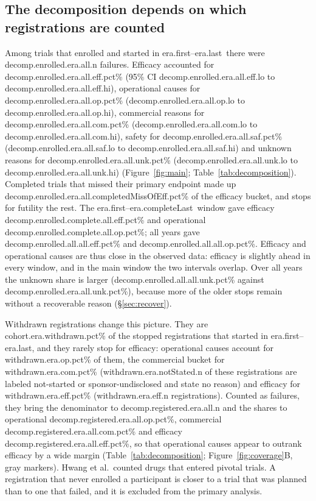 \documentclass[11pt]{article}
\newcommand{\era}{\num{era.first}--\num{era.last}}
\newcommand{\eracomplete}{\num{era.first}--\num{era.completeLast}}
\begin{document}
\subsection{The decomposition depends on which registrations are counted}\label{sec:population}
Among trials that enrolled and started in \era\ there were \num{decomp.enrolled.era.all.n} failures. Efficacy accounted for \num{decomp.enrolled.era.all.eff.pct}\% (95\% CI \num{decomp.enrolled.era.all.eff.lo} to \num{decomp.enrolled.era.all.eff.hi}), operational causes for \num{decomp.enrolled.era.all.op.pct}\% (\num{decomp.enrolled.era.all.op.lo} to \num{decomp.enrolled.era.all.op.hi}), commercial reasons for \num{decomp.enrolled.era.all.com.pct}\% (\num{decomp.enrolled.era.all.com.lo} to \num{decomp.enrolled.era.all.com.hi}), safety for \num{decomp.enrolled.era.all.saf.pct}\% (\num{decomp.enrolled.era.all.saf.lo} to \num{decomp.enrolled.era.all.saf.hi}) and unknown reasons for \num{decomp.enrolled.era.all.unk.pct}\% (\num{decomp.enrolled.era.all.unk.lo} to \num{decomp.enrolled.era.all.unk.hi}) (Figure~\ref{fig:main}; Table~\ref{tab:decomposition}). Completed trials that missed their primary endpoint made up \num{decomp.enrolled.era.all.completedMissOfEff.pct}\% of the efficacy bucket, and stops for futility the rest. The \eracomplete\ window gave efficacy \num{decomp.enrolled.complete.all.eff.pct}\% and operational \num{decomp.enrolled.complete.all.op.pct}\%; all years gave \num{decomp.enrolled.all.all.eff.pct}\% and \num{decomp.enrolled.all.all.op.pct}\%. Efficacy and operational causes are thus close in the observed data: efficacy is slightly ahead in every window, and in the main window the two intervals overlap. Over all years the unknown share is larger (\num{decomp.enrolled.all.all.unk.pct}\% against \num{decomp.enrolled.era.all.unk.pct}\%), because more of the older stops remain without a recoverable reason (\S\ref{sec:recover}).

Withdrawn registrations change this picture. They are \num{cohort.era.withdrawn.pct}\% of the stopped registrations that started in \era, and they rarely stop for efficacy: operational causes account for \num{withdrawn.era.op.pct}\% of them, the commercial bucket for \num{withdrawn.era.com.pct}\% (\num{withdrawn.era.notStated.n} of these registrations are labeled not-started or sponsor-undisclosed and state no reason) and efficacy for \num{withdrawn.era.eff.pct}\% (\num{withdrawn.era.eff.n} registrations). Counted as failures, they bring the denominator to \num{decomp.registered.era.all.n} and the shares to operational \num{decomp.registered.era.all.op.pct}\%, commercial \num{decomp.registered.era.all.com.pct}\% and efficacy \num{decomp.registered.era.all.eff.pct}\%, so that operational causes appear to outrank efficacy by a wide margin (Table~\ref{tab:decomposition}; Figure~\ref{fig:coverage}B, gray markers). Hwang et al.\ counted drugs that entered pivotal trials. A registration that never enrolled a participant is closer to a trial that was planned than to one that failed, and it is excluded from the primary analysis.
\end{document}
